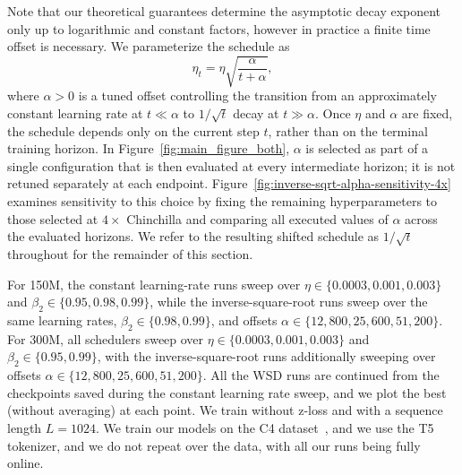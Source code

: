 \documentclass{article}
\theoremstyle{plain}
\begin{document}
Note that our theoretical guarantees determine the asymptotic decay exponent only up to logarithmic and constant factors, however in practice a finite time offset is necessary. We parameterize the schedule as
\[
\eta_t=\eta\sqrt{\frac{\alpha}{t+\alpha}},
\]
where \(\alpha>0\) is a tuned offset controlling the transition from an approximately constant learning rate at \(t\ll\alpha\) to \(1/\sqrt{t}\) decay at \(t\gg\alpha\). Once \(\eta\) and \(\alpha\) are fixed, the schedule depends only on the current step \(t\), rather than on the terminal training horizon. In Figure~\ref{fig:main_figure_both}, \(\alpha\) is selected as part of a single configuration that is then evaluated at every intermediate horizon; it is not retuned separately at each endpoint. Figure~\ref{fig:inverse-sqrt-alpha-sensitivity-4x} examines sensitivity to this choice by fixing the remaining hyperparameters to those selected at \(4\times\) Chinchilla and comparing all executed values of \(\alpha\) across the evaluated horizons. We refer to the resulting shifted schedule as \(1/\sqrt{t}\) throughout for the remainder of this section.

For 150M, the constant learning-rate runs sweep over $\eta \in \{0.0003,0.001,0.003\}$ and $\beta_2\in\{0.95,0.98,0.99\}$, while the inverse-square-root runs sweep over the same learning rates, $\beta_2\in\{0.98,0.99\}$, and offsets $\alpha\in\{12{,}800,25{,}600,51{,}200\}$. For 300M, all schedulers sweep over $\eta\in\{0.0003,0.001,0.003\}$ and $\beta_2\in\{0.95,0.99\}$, with the inverse-square-root runs additionally sweeping over offsets $\alpha\in\{12{,}800,25{,}600,51{,}200\}$. All the WSD runs are continued from the checkpoints saved during the constant learning rate sweep, and we plot the best (without averaging) at each point. We train without z-loss and with a sequence length $L=1024$. We train our models on the C4 dataset~\citep{2020t5}, and we use the T5 tokenizer, and we do not repeat over the data, with all our runs being fully online.
\end{document}
